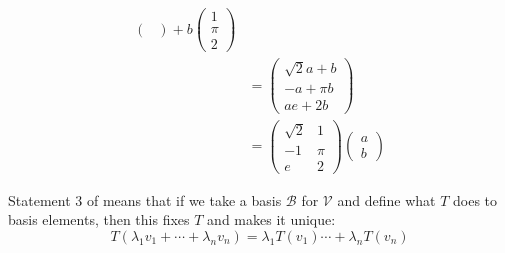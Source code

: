 \begin{exm}
\begin{align*}
\begin{pmatrix}
		\end{pmatrix}+b\begin{pmatrix}
			1 \\ \pi \\ 2
		\end{pmatrix}   \\
		                             & =\begin{pmatrix}
			\sqrt{2}a + b \\
			-a + \pi b    \\
			ae +2b
		\end{pmatrix}                                 \\
		                             & =\begin{pmatrix}
			\sqrt{2} & 1   \\
			-1       & \pi \\
			e        & 2
		\end{pmatrix}\begin{pmatrix}
			a \\ b
		\end{pmatrix}
	\end{align*}
\end{exm}

\begin{rem}
	Statement 3 of  means that if we take
	a basis $\mathcal{B}$ for $\mathcal{V}$ and define what $T$ does to basis
	elements, then this fixes $T$ and makes it unique:
	\begin{equation*}
		T(\lambda_1v_1+\cdots+\lambda_nv_n)=\lambda_1T(v_1)\cdots+\lambda_nT(v_n)
	\end{equation*}
\end{rem}

